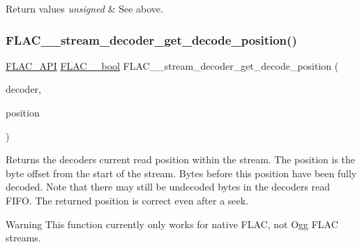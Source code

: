 \begin{DoxyRetVals}{Return values}
{\em unsigned} & See above. \\
\hline
\end{DoxyRetVals}
\mbox{\label{group__flac__stream__decoder_ga11507d25b6fdbd1efd5ee642923730fa}} 
\subsubsection{\texorpdfstring{F\+L\+A\+C\+\_\+\+\_\+stream\+\_\+decoder\+\_\+get\+\_\+decode\+\_\+position()}{FLAC\_\_stream\_decoder\_get\_decode\_position()}}
{\footnotesize\ttfamily \hyperlink{group__flac__export_ga56ca07df8a23310707732b1c0007d6f5}{F\+L\+A\+C\+\_\+\+A\+PI} \hyperlink{ordinals_8h_a95103469f1cbd78b8cf250194985b34e}{F\+L\+A\+C\+\_\+\+\_\+bool} F\+L\+A\+C\+\_\+\+\_\+stream\+\_\+decoder\+\_\+get\+\_\+decode\+\_\+position (\begin{DoxyParamCaption}\item[{\hyperlink{zconf_8h_a2c212835823e3c54a8ab6d95c652660e}{const} \hyperlink{struct_f_l_a_c_____stream_decoder}{F\+L\+A\+C\+\_\+\+\_\+\+Stream\+Decoder} $\ast$}]{decoder,  }\item[{\hyperlink{ordinals_8h_aa78c8c70a3eb8a58af7436f278acde8e}{F\+L\+A\+C\+\_\+\+\_\+uint64} $\ast$}]{position }\end{DoxyParamCaption})}

Returns the decoder\textquotesingle{}s current read position within the stream. The position is the byte offset from the start of the stream. Bytes before this position have been fully decoded. Note that there may still be undecoded bytes in the decoder\textquotesingle{}s read F\+I\+FO. The returned position is correct even after a seek.

\begin{DoxyWarning}{Warning}
This function currently only works for native F\+L\+AC, not Ogg F\+L\+AC streams.
\end{DoxyWarning}

